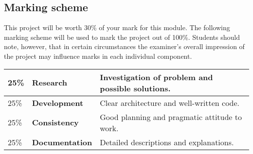 \documentclass[12pt, a4paper]{article}
\begin{document}
\subsection*{Marking scheme}
This project will be worth 30\% of your mark for this module.
The following marking scheme will be used to mark the project out of 100\%.
Students should note, however, that in certain circumstances the examiner's overall impression of the project may influence marks in each individual component.

\begin{center}
  \begin{tabular}{llp{8.4cm}}
    \toprule
    25\% & \textbf{Research} & Investigation of problem and possible solutions. \\
    \midrule
    25\% & \textbf{Development} & Clear architecture and well-written code. \\
    \midrule
    25\% & \textbf{Consistency} & Good planning and pragmatic attitude to work. \\
    \midrule
    25\% & \textbf{Documentation} & Detailed descriptions and explanations. \\
    \bottomrule
  \end{tabular}
\end{center}
\end{document}
